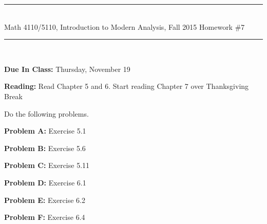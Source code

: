 \documentclass[11pt,reqno]{amsart}
\newcommand{\spacer}{\vspace{.4cm}}
\begin{document}
\begin{center}
\hrule \ \\
\large \textsf{Math 4110/5110, Introduction to Modern Analysis, Fall 2015} \hfill
\Large Homework \#7 \vspace{.25cm} \hrule \
\end{center}

\spacer

\textbf{Due In Class:} Thursday, November 19  \spacer

\textbf{Reading:} Read Chapter 5 and 6. Start reading Chapter 7 over Thanksgiving Break \spacer

Do the following problems. \spacer

\textbf{Problem A:} Exercise 5.1 \spacer

\textbf{Problem B:} Exercise 5.6  \spacer

\textbf{Problem C:} Exercise 5.11  \spacer

\textbf{Problem D:} Exercise 6.1 \spacer

\textbf{Problem E:} Exercise 6.2 \spacer

\textbf{Problem F:} Exercise 6.4
\end{document}
